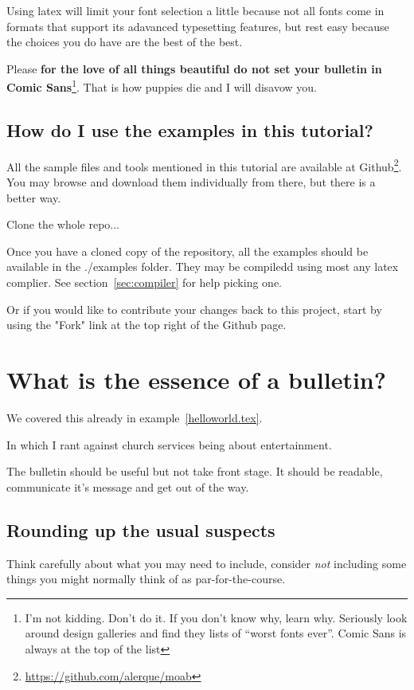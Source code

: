 \documentclass[12pt]{scrartcl}
\newcommand*{\texample}[1]{
		\lstset{
			frame=shadowbox,
			title=#1.tex,
			caption=[file: #1.tex]#1.tex,
			label=#1
		}
		
	}
\begin{document}
Using latex will limit your font selection a little because not all fonts
come in formats that support its adavanced typesetting features, but rest easy
because the choices you do have are the best of the best.

Please \textbf{for the love of all things beautiful do not set your bulletin in
	Comic Sans}\footnote{I'm not kidding. Don't do it. If you don't know
	why, learn why. Seriously look around design galleries and find they
	lists of ``worst fonts ever''. Comic Sans is always at the top of the
	list}. That is how puppies die and I will disavow you.

\texample{libertine}

\subsection{How do I use the examples in this tutorial?}

All the sample files and tools mentioned in this tutorial are available at
Github\footnote{\url{https://github.com/alerque/moab}}. You may browse and download them
individually from there, but there is a better way.

Clone the whole repo...

Once you have a cloned copy of the repository, all the examples should be
available in the ./examples folder. They may be compiledd using most any latex
complier. See section~\vref{sec:compiler} for help picking one.

Or if you would like to contribute your changes back to this project, start by
using the "Fork" link at the top right of the Github page.

\section{What is the essence of a bulletin?}

We covered this already in example~\vref{helloworld.tex}.

In which I rant against church services being about entertainment.

The bulletin should be useful but not take front stage. It should be readable,
communicate it's message and get out of the way.

\subsection{Rounding up the usual suspects}

Think carefully about what you may need to include, consider \emph{not}
including some things you might normally think of as par-for-the-course.
\end{document}
